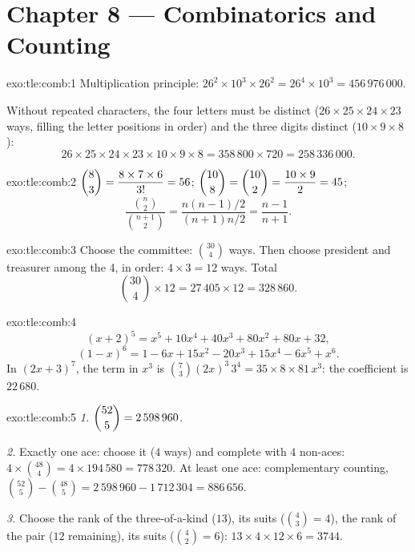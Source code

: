 \section*{Chapter 8 --- Combinatorics and Counting}

\begin{solution}{exo:tle:comb:1}
Multiplication principle:
$26^2 \times 10^3 \times 26^2 = 26^4 \times 10^3 = 456\,976\,000$.

Without repeated characters, the four letters must be distinct
($26 \times 25 \times 24 \times 23$ ways, filling the letter positions in
order) and the three digits distinct ($10 \times 9 \times 8$):
\[
26 \times 25 \times 24 \times 23 \times 10 \times 9 \times 8
= 358\,800 \times 720 = 258\,336\,000 .
\]
\end{solution}

\begin{solution}{exo:tle:comb:2}
$\dbinom83 = \dfrac{8 \times 7 \times 6}{3!} = 56$;
$\dbinom{10}{8} = \dbinom{10}{2} = \dfrac{10 \times 9}{2} = 45$;
\[
\frac{\binom n2}{\binom{n+1}2}
= \frac{n(n-1)/2}{(n+1)n/2} = \frac{n-1}{n+1}.
\]
\end{solution}

\begin{solution}{exo:tle:comb:3}
Choose the committee: $\binom{30}{4}$ ways. Then choose president and
treasurer among the 4, in order: $4 \times 3 = 12$ ways. Total
\[
\binom{30}{4} \times 12 = 27\,405 \times 12 = 328\,860 .
\]
\end{solution}

\begin{solution}{exo:tle:comb:4}
\[
(x+2)^5 = x^5 + 10x^4 + 40x^3 + 80x^2 + 80x + 32 ,
\]
\[
(1-x)^6 = 1 - 6x + 15x^2 - 20x^3 + 15x^4 - 6x^5 + x^6 .
\]
In $(2x+3)^7$, the term in $x^3$ is
$\binom{7}{3}(2x)^3\,3^4 = 35 \times 8 \times 81\, x^3$: the coefficient is
$22\,680$.
\end{solution}

\begin{solution}{exo:tle:comb:5}
\emph{1.} $\dbinom{52}{5} = 2\,598\,960$.

\emph{2.} Exactly one ace: choose it ($4$ ways) and complete with $4$
non-aces: $4 \times \binom{48}{4} = 4 \times 194\,580 = 778\,320$.
At least one ace: complementary counting,
$\binom{52}{5} - \binom{48}{5} = 2\,598\,960 - 1\,712\,304 = 886\,656$.

\emph{3.} Choose the rank of the three-of-a-kind ($13$), its suits
($\binom43 = 4$), the rank of the pair ($12$ remaining), its suits
($\binom42 = 6$):
$13 \times 4 \times 12 \times 6 = 3744$.
\end{solution}

